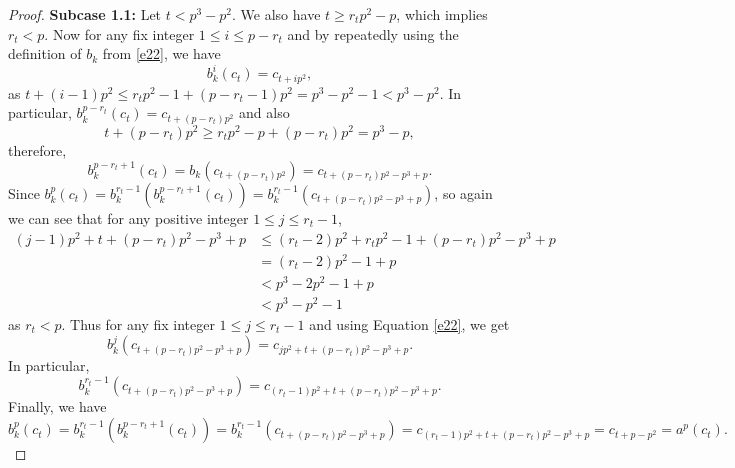 \documentclass[11pt]{amsart}
\theoremstyle{plain}
\numberwithin{equation}{section}
\begin{document}
\begin{proof}

\textbf{Subcase 1.1:} Let $t < p^3-p^2$. We also have $ t \geq r_tp^{2}-p $, which implies $r_t <p$. Now for any fix integer  $1 \leq i \leq p-r_t$ and by repeatedly using the definition of $b_k$ from \eqref{e22}, we have
\[
b_{k}^{i}(c_t)=c_{t+ip^2},
\]
as $t+(i-1)p^2 \leq r_tp^2-1+(p-r_t-1)p^2=p^3-p^2-1< p^3-p^2$. In particular, $b_{k}^{p-r_t}(c_t)=c_{t+(p-r_t)p^2}$ and also $$t+(p-r_t)p^2 \geq r_tp^{2}-p+(p-r_t)p^2=p^3-p,$$ therefore, 
$$b_{k}^{p-r_t+1}(c_t)=b_{k}(c_{t+(p-r_t)p^2})=c_{t+(p-r_t)p^2-p^3+p}.$$
Since $b_{k}^{p}(c_t)=b_{k}^{r_t-1}(b_{k}^{p-r_t+1}(c_t))=b_{k}^{r_t-1}(c_{t+(p-r_t)p^2-p^3+p})$, so again we can see that for any positive integer $1 \leq j \leq r_t-1$,
\begin{equation*}
\begin{split}
(j-1)p^2+t+(p-r_t)p^2-p^3+p & \leq  (r_t-2)p^2+r_tp^2-1+(p-r_t)p^2-p^3+p \\&=(r_t-2)p^2-1+p \\&<p^3-2p^2-1+p\\&<p^3-p^2-1
\end{split}
\end{equation*}
as $r_t<p$.
Thus for any fix integer $1 \leq j \leq r_t-1$ and using Equation \eqref{e22}, we get 
\[
b_{k}^{j}(c_{t+(p-r_t)p^2-p^3+p})=c_{jp^2+t+(p-r_t)p^2-p^3+p}. 
\]
 In particular, 
 $$b_{k}^{r_t-1}(c_{t+(p-r_t)p^2-p^3+p})=c_{(r_t-1)p^2+t+(p-r_t)p^2-p^3+p}.$$ 
 Finally, we have
\[
b_{k}^{p}(c_t)=b_{k}^{r_t-1}(b_{k}^{p-r_t+1}(c_t))=b_{k}^{r_t-1}(c_{t+(p-r_t)p^2-p^3+p})=c_{(r_t-1)p^2+t+(p-r_t)p^2-p^3+p}=c_{t+p-p^2}=a^{p}(c_t).
\]


\end{proof}
\end{document}
